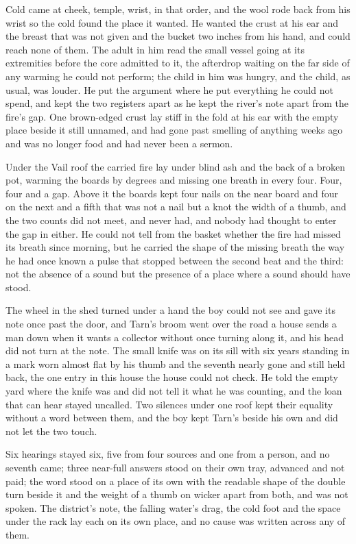 Cold came at cheek, temple, wrist, in that order, and the wool rode back from his wrist so the cold found the place it wanted. He wanted the crust at his ear and the breast that was not given and the bucket two inches from his hand, and could reach none of them. The adult in him read the small vessel going at its extremities before the core admitted to it, the afterdrop waiting on the far side of any warming he could not perform; the child in him was hungry, and the child, as usual, was louder. He put the argument where he put everything he could not spend, and kept the two registers apart as he kept the river's note apart from the fire's gap. One brown-edged crust lay stiff in the fold at his ear with the empty place beside it still unnamed, and had gone past smelling of anything weeks ago and was no longer food and had never been a sermon.

\scenebreak

Under the Vail roof the carried fire lay under blind ash and the back of a broken pot, warming the boards by degrees and missing one breath in every four. Four, four and a gap. Above it the boards kept four nails on the near board and four on the next and a fifth that was not a nail but a knot the width of a thumb, and the two counts did not meet, and never had, and nobody had thought to enter the gap in either. He could not tell from the basket whether the fire had missed its breath since morning, but he carried the shape of the missing breath the way he had once known a pulse that stopped between the second beat and the third: not the absence of a sound but the presence of a place where a sound should have stood.

The wheel in the shed turned under a hand the boy could not see and gave its note once past the door, and Tarn's broom went over the road a house sends a man down when it wants a collector without once turning along it, and his head did not turn at the note. The small knife was on its sill with six years standing in a mark worn almost flat by his thumb and the seventh nearly gone and still held back, the one entry in this house the house could not check. He told the empty yard where the knife was and did not tell it what he was counting, and the loan that can hear stayed uncalled. Two silences under one roof kept their equality without a word between them, and the boy kept Tarn's beside his own and did not let the two touch.

Six hearings stayed six, five from four sources and one from a person, and no seventh came; three near-full answers stood on their own tray, advanced and not paid; the word stood on a place of its own with the readable shape of the double turn beside it and the weight of a thumb on wicker apart from both, and was not spoken. The district's note, the falling water's drag, the cold foot and the space under the rack lay each on its own place, and no cause was written across any of them.

